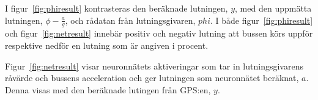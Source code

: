 I figur~\ref{fig:phiresult} kontrasteras den beräknade lutningen, $y$, med den
uppmätta lutningen, $ \phi - \frac{a}{g} $, och rådatan från
lutningsgivaren, $phi$.
I både figur~\ref{fig:phiresult} och figur~\ref{fig:netresult}
innebär positiv och negativ lutning att bussen körs uppför respektive
nedför en lutning som är angiven i procent.

Figur~\ref{fig:netresult} visar neuronnätets aktiveringar som tar in
lutningsgivarens råvärde och bussens acceleration
och ger lutningen som neuronnätet beräknat, $a$.
Denna visas med den beräknade lutingen från GPS:en, $y$.
